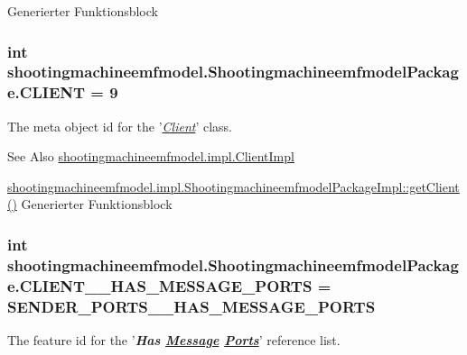 Generierter Funktionsblock  \hypertarget{interfaceshootingmachineemfmodel_1_1_shootingmachineemfmodel_package_a1c00701cdfb4ee9e77a8d05edc4c89ed}{
\subsubsection[{C\-L\-I\-E\-N\-T}]{\setlength{\rightskip}{0pt plus 5cm}int shootingmachineemfmodel.\-Shootingmachineemfmodel\-Package.\-C\-L\-I\-E\-N\-T = 9}}\label{interfaceshootingmachineemfmodel_1_1_shootingmachineemfmodel_package_a1c00701cdfb4ee9e77a8d05edc4c89ed}
The meta object id for the '\hyperlink{classshootingmachineemfmodel_1_1impl_1_1_client_impl}{{\itshape Client}}' class.

\begin{DoxySeeAlso}{See Also}
\hyperlink{classshootingmachineemfmodel_1_1impl_1_1_client_impl}{shootingmachineemfmodel.\-impl.\-Client\-Impl} 

\hyperlink{classshootingmachineemfmodel_1_1impl_1_1_shootingmachineemfmodel_package_impl_a123185c43f45f06c9153fad113ff5642}{shootingmachineemfmodel.\-impl.\-Shootingmachineemfmodel\-Package\-Impl\-::get\-Client()} Generierter Funktionsblock 
\end{DoxySeeAlso}
\hypertarget{interfaceshootingmachineemfmodel_1_1_shootingmachineemfmodel_package_a202487038e6af15ca1b3bb8742010a8e}{
\subsubsection[{C\-L\-I\-E\-N\-T\-\_\-\-\_\-\-H\-A\-S\-\_\-\-M\-E\-S\-S\-A\-G\-E\-\_\-\-P\-O\-R\-T\-S}]{\setlength{\rightskip}{0pt plus 5cm}int shootingmachineemfmodel.\-Shootingmachineemfmodel\-Package.\-C\-L\-I\-E\-N\-T\-\_\-\-\_\-\-H\-A\-S\-\_\-\-M\-E\-S\-S\-A\-G\-E\-\_\-\-P\-O\-R\-T\-S = {\bf S\-E\-N\-D\-E\-R\-\_\-\-P\-O\-R\-T\-S\-\_\-\-\_\-\-H\-A\-S\-\_\-\-M\-E\-S\-S\-A\-G\-E\-\_\-\-P\-O\-R\-T\-S}}}\label{interfaceshootingmachineemfmodel_1_1_shootingmachineemfmodel_package_a202487038e6af15ca1b3bb8742010a8e}
The feature id for the '{\itshape {\bfseries Has \hyperlink{interfaceshootingmachineemfmodel_1_1_message}{Message} \hyperlink{interfaceshootingmachineemfmodel_1_1_ports}{Ports}}}' reference list.

